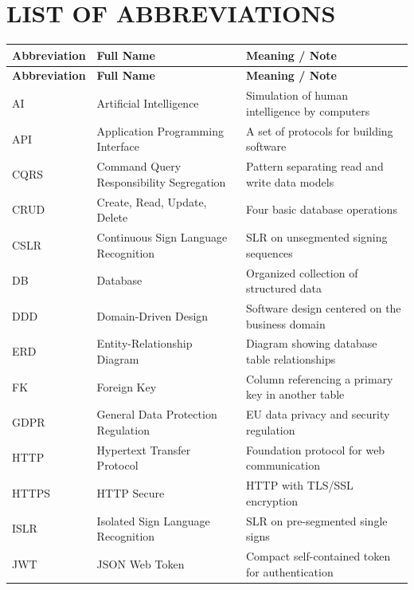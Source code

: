 \newpage
\chapter*{LIST OF ABBREVIATIONS}

\small
\begin{longtable}{|p{2.2cm}|p{5.8cm}|p{5.4cm}|}
\hline
\textbf{Abbreviation} & \textbf{Full Name} & \textbf{Meaning / Note} \\
\hline
\endfirsthead
\hline
\textbf{Abbreviation} & \textbf{Full Name} & \textbf{Meaning / Note} \\
\hline
\endhead
\hline
\endfoot
AI      & Artificial Intelligence & Simulation of human intelligence by computers \\ \hline
API     & Application Programming Interface & A set of protocols for building software \\ \hline
CQRS    & Command Query Responsibility Segregation & Pattern separating read and write data models \\ \hline
CRUD    & Create, Read, Update, Delete & Four basic database operations \\ \hline
CSLR    & Continuous Sign Language Recognition & SLR on unsegmented signing sequences \\ \hline
DB      & Database & Organized collection of structured data \\ \hline
DDD     & Domain-Driven Design & Software design centered on the business domain \\ \hline
ERD     & Entity-Relationship Diagram & Diagram showing database table relationships \\ \hline
FK      & Foreign Key & Column referencing a primary key in another table \\ \hline
GDPR    & General Data Protection Regulation & EU data privacy and security regulation \\ \hline
HTTP    & Hypertext Transfer Protocol & Foundation protocol for web communication \\ \hline
HTTPS   & HTTP Secure & HTTP with TLS/SSL encryption \\ \hline
ISLR    & Isolated Sign Language Recognition & SLR on pre-segmented single signs \\ \hline
JWT     & JSON Web Token & Compact self-contained token for authentication \\ \hline

\end{longtable}

